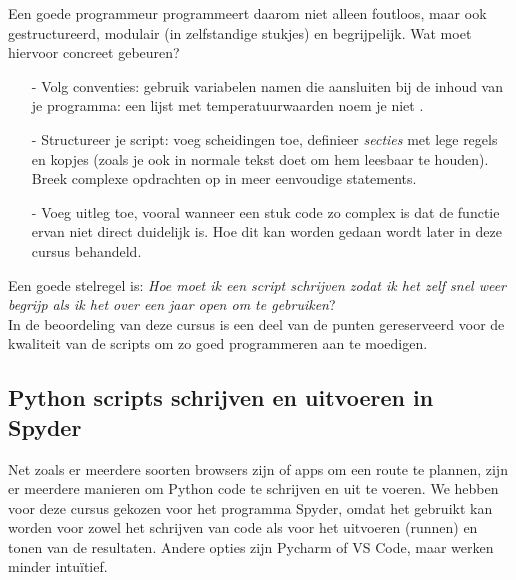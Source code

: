 \documentclass[a4paper,11pt, fleqn]{article}
\begin{document}
Een goede programmeur programmeert daarom niet alleen foutloos, maar ook gestructureerd, modulair (in zelfstandige stukjes) en begrijpelijk. Wat moet hiervoor concreet gebeuren?
\begin{itemize}
\item[-] Volg conventies: gebruik variabelen namen die aansluiten bij de inhoud van je programma: een lijst met temperatuurwaarden noem je niet .
\item[-] Structureer je script: voeg scheidingen toe, definieer \textit{secties} met lege regels en kopjes (zoals je ook in normale tekst doet om hem leesbaar te houden). Breek complexe opdrachten op in meer eenvoudige statements.
\item[-] Voeg uitleg toe, vooral wanneer een stuk code zo complex is dat de functie ervan niet direct duidelijk is. Hoe dit kan worden gedaan wordt later in deze cursus behandeld.
\end{itemize}

Een goede stelregel is: \textit{Hoe moet ik een script schrijven zodat ik het zelf snel weer begrijp als ik het over een jaar open om te gebruiken}? \\
In de beoordeling van deze cursus is een deel van de punten gereserveerd voor de kwaliteit van de scripts om zo goed programmeren aan te moedigen.

\subsection{Python scripts schrijven en uitvoeren in Spyder}
Net zoals er meerdere soorten browsers zijn of apps om een route te plannen, zijn er meerdere manieren om Python code te schrijven en uit te voeren. We hebben voor deze cursus gekozen voor het programma Spyder, omdat het gebruikt kan worden voor zowel het schrijven van code als voor het uitvoeren (runnen) en tonen van de resultaten. Andere opties zijn Pycharm of VS Code, maar werken minder intuïtief.
\end{document}
